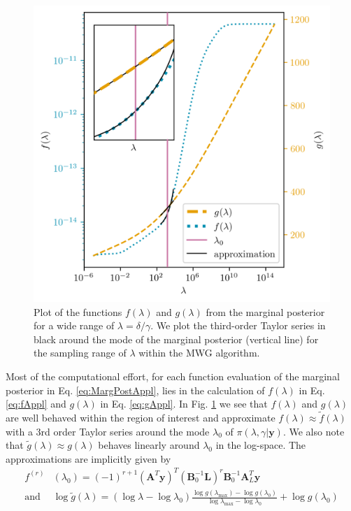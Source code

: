 \begin{figure}[ht!]
	\centering
	\includegraphics{f_and_g_phd.png}
	\caption[Plot of the functions $f(\lambda)$ and $g(\lambda)$ for marginal posterior.]{Plot of the functions $f(\lambda)$ and $g(\lambda)$ from the marginal posterior for a wide range of $\lambda = \delta / \gamma$. We plot the third-order Taylor series in black around the mode of the marginal posterior (vertical line) for the sampling range of $\lambda$ within the MWG algorithm.}
	\label{fig:fandg}
\end{figure}
Most of the computational effort, for each function evaluation of the marginal posterior in Eq. \ref{eq:MargPostAppl}, lies in the calculation of $f(\lambda)$ in Eq. \ref{eq:fAppl} and $g(\lambda)$ in Eq. \ref{eq:gAppl}.
In  Fig. \ref{fig:fandg} we see that $f(\lambda)$ and $g(\lambda)$ are well behaved within the region of interest and approximate $f(\lambda) \approx \tilde{f}(\lambda)$ with a 3rd order Taylor series around the mode $\lambda_0$ of $\pi(\lambda, \gamma | \bm{y})$.
We also note that $\tilde{g}(\lambda) \approx g(\lambda)$ behaves linearly around $\lambda_0$ in the log-space.
The approximations are implicitly given by
\begin{align}
	f^{(r)}& (\lambda_0)= (-1)^{r+1} (\bm{A}^T \bm{y})^T (\bm{B}_0^{-1} \bm{L})^r \bm{B}_0^{-1} \bm{A}_L^T \bm{y} \label{eq:ftay}  \\
	\text{and } & \log{ \tilde{g}(\lambda)} = (\log{\lambda} - \log{\lambda_{0}})  \frac{ \log{g(\lambda_{\text{max}})} - \log{g(\lambda_{0})} }{\log{\lambda_{\text{max}}} - \log{\lambda_{0}} } + \log{ g(\lambda_{0})} 
	\label{eq:gtay}
\end{align} 

